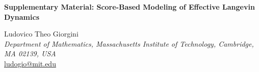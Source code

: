\documentclass[%
  prl,
  reprint,
  amsmath,
  amssymb,
  aps
]{revtex4-2}
\begin{document}
\begin{center}
{\Large\bfseries Supplementary Material: Score-Based Modeling of Effective Langevin Dynamics}

\vspace{1em}

Ludovico Theo Giorgini\\
\textit{Department of Mathematics, Massachusetts Institute of Technology, Cambridge, MA 02139, USA}\\
\href{mailto:ludogio@mit.edu}{ludogio@mit.edu}
\end{center}

\vspace{1em}

\setcounter{secnumdepth}{3}
\setcounter{section}{0}
\renewcommand{\thesection}{\Roman{section}}
\renewcommand{\thesubsection}{\thesection.\Alph{subsection}}
\renewcommand{\thesubsubsection}{\thesubsection.\arabic{subsubsection}}

\makeatletter
\renewcommand\section{\@startsection{section}{1}{\z@}%
                                   {-3.5ex \@plus -1ex \@minus -.2ex}%
                                   {2.3ex \@plus.2ex}%
                                   {\normalfont\Large\bfseries}}
\renewcommand\subsection{\@startsection{subsection}{2}{\z@}%
                                     {-3.25ex\@plus -1ex \@minus -.2ex}%
                                     {1.5ex \@plus .2ex}%
                                     {\normalfont\large\bfseries}}
\renewcommand\subsubsection{\@startsection{subsubsection}{3}{\z@}%
                                     {-3.25ex\@plus -1ex \@minus -.2ex}%
                                     {1.5ex \@plus .2ex}%
                                     {\normalfont\normalsize\bfseries}}
\makeatother
\end{document}
